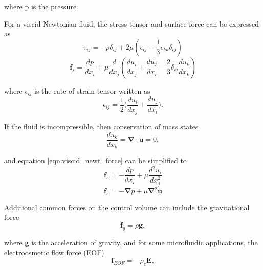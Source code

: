 \noindent where p is the pressure. 

\par For a viscid Newtonian fluid, the stress tensor and surface force can be expressed as \cite{probstein_physicochemical_2005}
\begin{equation}
    \tau_{ij} = -p\delta_{ij} + 2\mu(\epsilon_{ij} - \frac{1}{3}\epsilon_{kk}\delta_{ij})
\end{equation}
\begin{equation}
    \textbf{f}_s = \frac{dp}{dx_i} + \mu \frac{d}{dx_j}(\frac{du_i}{dx_j} + \frac{du_j}{dx_i} - \frac{2}{3}\delta_{ij}\frac{du_k}{dx_k})
    \label{eqn:viscid_newt_force}
\end{equation}

\noindent where $\epsilon_{ij}$ is the rate of strain tensor written as 
\begin{equation}
    \epsilon_{ij} = \frac{1}{2} \Big(\frac{du_i}{dx_j} + \frac{du_j}{dx_i}\Big).
\end{equation}

\noindent If the fluid is incompressible, then conservation of mass states
\begin{equation}
    \frac{du_k}{dx_k} = \boldsymbol{\nabla} \cdot \textbf{u} = 0,
    \label{eqn:incompressible_cons_mass}
\end{equation}

\noindent and equation \ref{eqn:viscid_newt_force} can be simplified to 
\begin{equation}
    \textbf{f}_s = -\frac{dp}{dx_i} + \mu \frac{d^2u_i}{dx^2_j}
\end{equation}
\begin{equation}
    \textbf{f}_s = -\boldsymbol{\nabla}p + \mu\boldsymbol{\nabla}^2\textbf{u}
    \label{eqn:viscous_pressure_force}
\end{equation}

\par Additional common forces on the control volume can include the gravitational force
\begin{equation}
    \textbf{f}_g = \rho \textbf{g},
    \label{eqn:gravity_force}
\end{equation}

\noindent where \textbf{g} is the acceleration of gravity, and for some microfluidic applications, the electroosmotic flow force (EOF)
\begin{equation}
    \textbf{f}_{EOF} = -\rho_e \boldsymbol{E},
\end{equation}

